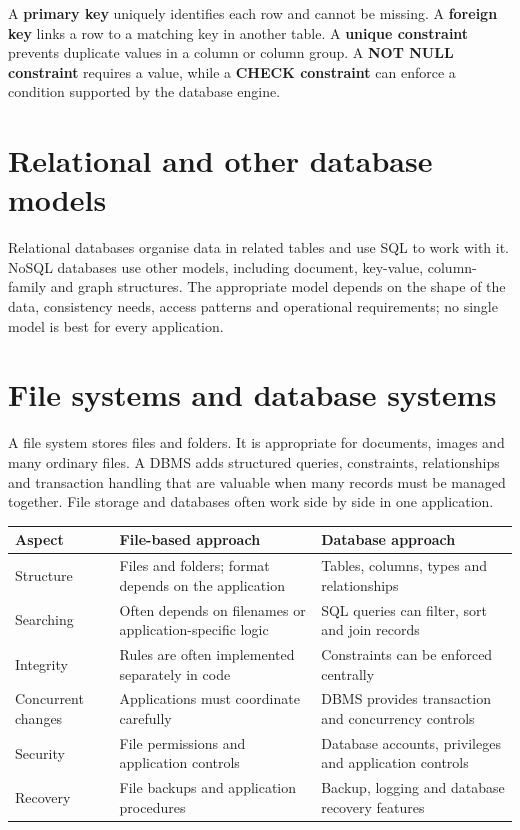 \documentclass[11pt,openany,oneside]{book}
\newcommand{\keyterm}[1]{\textbf{\color{Navy}#1}}
\begin{document}
A \keyterm{primary key} uniquely identifies each row and cannot be missing. A \keyterm{foreign key} links a row to a matching key in another table. A \keyterm{unique constraint} prevents duplicate values in a column or column group. A \keyterm{NOT NULL constraint} requires a value, while a \keyterm{CHECK constraint} can enforce a condition supported by the database engine.

\section{Relational and other database models}
Relational databases organise data in related tables and use SQL to work with it. NoSQL databases use other models, including document, key-value, column-family and graph structures. The appropriate model depends on the shape of the data, consistency needs, access patterns and operational requirements; no single model is best for every application.

\section{File systems and database systems}
A file system stores files and folders. It is appropriate for documents, images and many ordinary files. A DBMS adds structured queries, constraints, relationships and transaction handling that are valuable when many records must be managed together. File storage and databases often work side by side in one application.

\begin{center}
\begin{tabularx}{\textwidth}{p{}XX}
\toprule
\textbf{Aspect} & \textbf{File-based approach} & \textbf{Database approach}\\\midrule
Structure & Files and folders; format depends on the application & Tables, columns, types and relationships\\
Searching & Often depends on filenames or application-specific logic & SQL queries can filter, sort and join records\\
Integrity & Rules are often implemented separately in code & Constraints can be enforced centrally\\
Concurrent changes & Applications must coordinate carefully & DBMS provides transaction and concurrency controls\\
Security & File permissions and application controls & Database accounts, privileges and application controls\\
Recovery & File backups and application procedures & Backup, logging and database recovery features\\
\bottomrule
\end{tabularx}
\end{center}
\end{document}
